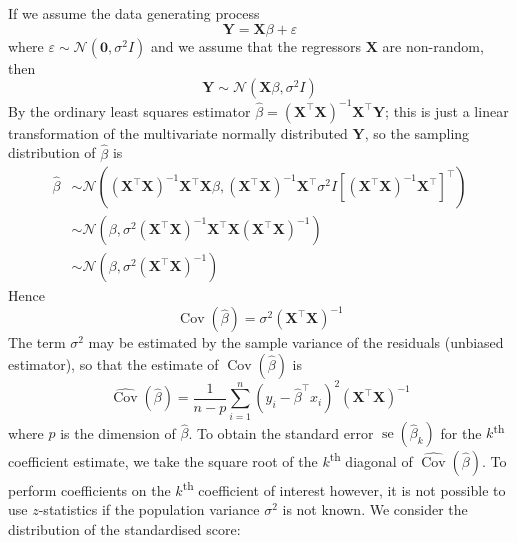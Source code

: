 \documentclass[11pt]{report} %
\begin{document}
If we assume the data generating process
\begin{equation}
\mathbf{Y} = \mathbf{X}\beta + \varepsilon
\end{equation}
where $\varepsilon \sim \mathcal{N}\left(\mathbf{0}, \sigma^{2}I\right)$ and we assume that the regressors $\mathbf{X}$ are non-random, then
\begin{equation}
\mathbf{Y} \sim \mathcal{N}\left(\mathbf{X}\beta, \sigma^{2}I\right)
\end{equation}
By the ordinary least squares estimator $\hat{\beta} = \left(\mathbf{X}^{\top}\mathbf{X}\right)^{-1}\mathbf{X}^{\top}\mathbf{Y}$; this is just a linear transformation of the multivariate normally distributed $\mathbf{Y}$, so the sampling distribution of $\hat{\beta}$ is
\begin{align}
\hat{\beta} &\sim \mathcal{N}\left(\left(\mathbf{X}^{\top}\mathbf{X}\right)^{-1}\mathbf{X}^{\top}\mathbf{X}\beta, \left(\mathbf{X}^{\top}\mathbf{X}\right)^{-1}\mathbf{X}^{\top}\sigma^{2}I\left[\left(\mathbf{X}^{\top}\mathbf{X}\right)^{-1}\mathbf{X}^{\top}\right]^{\top}\right) \\
&\sim \mathcal{N}\left(\beta, \sigma^{2}\left(\mathbf{X}^{\top}\mathbf{X}\right)^{-1}\mathbf{X}^{\top}\mathbf{X}\left(\mathbf{X}^{\top}\mathbf{X}\right)^{-1}\right) \\
&\sim \mathcal{N}\left(\beta, \sigma^{2}\left(\mathbf{X}^{\top}\mathbf{X}\right)^{-1}\right)
\end{align}
Hence
\begin{equation}
\operatorname{Cov}\left(\hat{\beta}\right) = \sigma^{2}\left(\mathbf{X}^{\top}\mathbf{X}\right)^{-1}
\end{equation}
The term $\sigma^{2}$ may be estimated by the sample variance of the residuals (unbiased estimator), so that the estimate of $\operatorname{Cov}\left(\hat{\beta}\right)$ is
\begin{equation}
\widehat{\operatorname{Cov}}\left(\hat{\beta}\right) = \dfrac{1}{n - p}\sum_{i = 1}^{n}\left(y_{i} - \hat{\beta}^{\top}x_{i}\right)^{2}\left(\mathbf{X}^{\top}\mathbf{X}\right)^{-1}
\end{equation}
where $p$ is the dimension of $\hat{\beta}$. To obtain the standard error $\operatorname{se}\left(\hat{\beta}_{k}\right)$ for the $k$\textsuperscript{th} coefficient estimate, we take the square root of the $k$\textsuperscript{th} diagonal of $\widehat{\operatorname{Cov}}\left(\hat{\beta}\right)$. To perform coefficients on the $k$\textsuperscript{th} coefficient of interest however, it is not possible to use $z$-statistics if the population variance $\sigma^{2}$ is not known. We consider the distribution of the standardised score:
\end{document}
